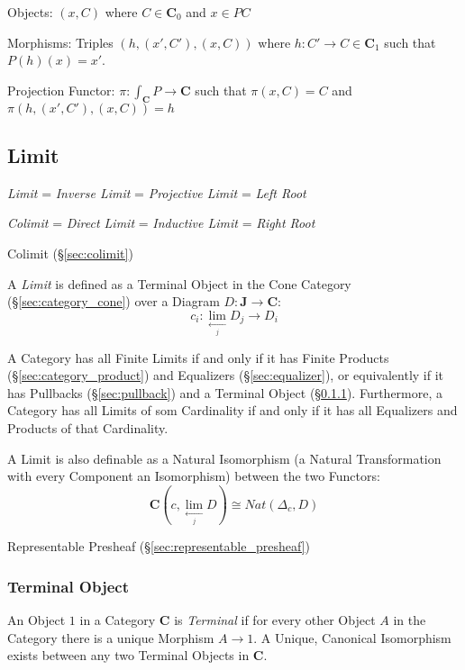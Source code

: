 Objects: $(x,C)$ where $C \in \mathbf{C}_0$ and $x \in PC$

Morphisms: Triples $(h, (x',C'), (x,C))$ where $h : C' \rightarrow C
\in \mathbf{C}_1$ such that $P(h)(x) = x'$.

Projection Functor: $\pi : \int_\mathbf{C} P \rightarrow \mathbf{C}$
such that $\pi(x,C) = C$ and $\pi(h, (x',C'), (x,C)) = h$



\subsection{Limit}\label{sec:limit}

\emph{Limit} = \emph{Inverse Limit} = \emph{Projective Limit} =
\emph{Left Root}

\emph{Colimit} = \emph{Direct Limit} = \emph{Inductive Limit} =
\emph{Right Root}

Colimit (\S\ref{sec:colimit})

A \emph{Limit} is defined as a Terminal Object in the Cone Category
(\S\ref{sec:category_cone}) over a Diagram $D : \mathbf{J} \rightarrow
\mathbf{C}$:
\[
  c_i : \lim_{\xleftarrow[j]{}} D_j \rightarrow D_i
\]

A Category has all Finite Limits if and only if it has Finite Products
(\S\ref{sec:category_product}) and Equalizers (\S\ref{sec:equalizer}),
or equivalently if it has Pullbacks (\S\ref{sec:pullback}) and a
Terminal Object (\S\ref{sec:terminal_object}). Furthermore, a Category
has all Limits of som Cardinality if and only if it has all Equalizers
and Products of that Cardinality. \cite{awodey06}

A Limit is also definable as a Natural Isomorphism (a Natural
Transformation with every Component an Isomorphism) between the two
Functors:
\[
  \mathbf{C}(c, \lim_{\xleftarrow[j]{}} D) \cong Nat (\Delta_c, D)
\]

Representable Presheaf (\S\ref{sec:representable_presheaf})



\subsubsection{Terminal Object}\label{sec:terminal_object}

An Object $1$ in a Category $\mathbf{C}$ is \emph{Terminal} if for
every other Object $A$ in the Category there is a unique Morphism $A
\rightarrow 1$. A Unique, Canonical Isomorphism exists between any two
Terminal Objects in $\mathbf{C}$.

